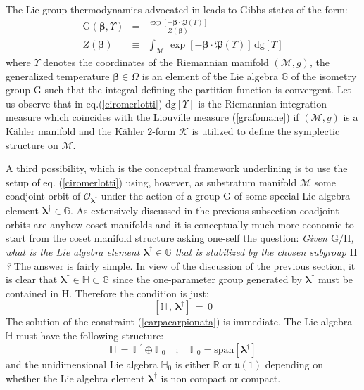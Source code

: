 \documentclass[10pt,a4paper]{article}
\newcommand{\uu}{\mathfrak{u}}
\begin{document}
\par
The Lie group thermodynamics advocated in \cite{caldobarbaresco,barbaresco2,barbaresco3,marlegibbs,marlentropia}
leads to Gibbs states of the form:
\begin{eqnarray}\label{ciromerlotti}
  \mathrm{G}\left(\boldsymbol{\beta},\Upsilon\right)&=&
  \frac{\exp\left[-\boldsymbol{\beta}\cdot \boldsymbol{\mathfrak{P}}(\Upsilon )\right]}{Z(\boldsymbol{\beta})}\nonumber\\
  Z(\boldsymbol{\beta}) & \equiv & \int_{\mathcal{M}}\,  \exp\left[-\boldsymbol{\beta}\cdot \boldsymbol{\mathfrak{P}}(\Upsilon)\right]\,  \mathrm{dg}\left[\Upsilon\right]
\end{eqnarray}
where  $\Upsilon$ denotes the coordinates of the Riemannian manifold $\left(\mathcal{M},g\right)$, the generalized temperature
$\boldsymbol{\beta}\in \Omega$ is an element of the Lie algebra $\mathbb{G}$ of the isometry group $\mathrm{G}$ such that the integral defining the partition function is convergent. Let us observe that in eq.(\ref{ciromerlotti}) $\mathrm{dg}\left[\Upsilon\right]$ is the Riemannian integration measure which coincides with the Liouville measure (\ref{grafomane}) if $\left(\mathcal{M},g\right)$ is a K\"ahler manifold and the K\"ahler $2$-form $\boldsymbol{\mathcal{K}}$ is utilized to define the symplectic structure on $\mathcal{M}$.
\par
A third possibility, which is the conceptual framework  underlining \cite{caldobarbaresco,barbaresco2,barbaresco3,marlegibbs,marlentropia} is to use the setup of eq. (\ref{ciromerlotti}) using, however, as
substratum manifold $\mathcal{M}$ some coadjoint orbit of $\mathcal{O}_{\boldsymbol{\lambda}^\dagger}$ under the action of a group $\mathrm{G}$ of  some special Lie algebra element $\boldsymbol{\lambda}^\dagger\in \mathbb{G}$. As extensively discussed in the previous subsection coadjoint orbits are anyhow coset manifolds and it is conceptually much more economic to start from the coset manifold structure asking one-self the question: \textit{Given $\mathrm{G/H}$, what is the Lie algebra element $\boldsymbol{\lambda}^\dagger
\in \mathbb{G}$ that is stabilized by the chosen subgroup $\mathrm{H}$?} The answer is fairly simple. In view of the discussion of the previous section, it is clear that $\boldsymbol{\lambda}^\dagger \in \mathbb{H} \subset \mathbb{G}$ since the one-parameter group generated by
$\boldsymbol{\lambda}^\dagger$ must be contained in $\mathrm{H}$. Therefore the condition is just:
\begin{equation}\label{carpacarpionata}
  \left[ \mathbb{H} \, , \, \boldsymbol{\lambda}^\dagger\right] \, = \, 0
\end{equation}
The solution of the constraint (\ref{carpacarpionata}) is immediate. The Lie algebra $\mathbb{H}$ must have the following structure:
\begin{equation}\label{crunacammello}
  \mathbb{H} \, = \, \mathbb{H}^\prime \oplus \mathbb{H}_0 \quad ; \quad \mathbb{H}_0 = \text{span}[\boldsymbol{\lambda}^\dagger]
\end{equation}
and the unidimensional Lie algebra $\mathbb{H}_0$ is either $\mathbb{R}$ or $\uu(1)$ depending on whether the Lie algebra element
$\boldsymbol{\lambda}^\dagger$ is non compact or compact.
\end{document}
